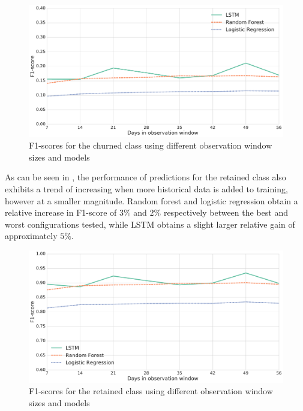 \documentclass{kththesis}
\begin{document}
\begin{figure}[H]
    \centering
    \includegraphics[width=1.0\textwidth,keepaspectratio]{figures/line_obs_window.pdf}
    \caption{F1-scores for the churned class using different observation window sizes and models}
    \label{fig:line_obs_window}
\end{figure}

As can be seen in , the performance of predictions for the retained class also exhibits a trend of increasing when more historical data is added to training, however at a smaller magnitude. Random forest and logistic regression obtain a relative increase in F1-score of $3\%$ and $2\%$ respectively between the best and worst configurations tested, while LSTM obtains a slight larger relative gain of approximately $5\%$.

\begin{figure}[H]
    \centering
    \includegraphics[width=1.0\textwidth,keepaspectratio]{figures/line_obs_window_retained.pdf}
    \caption{F1-scores for the retained class using different observation window sizes and models}
    \label{fig:line_obs_window_ret}
\end{figure}
\end{document}
